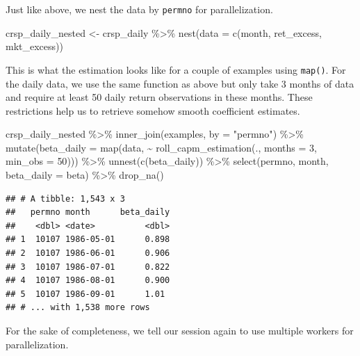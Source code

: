 \documentclass[
]{krantz}
\newenvironment{Shaded}{\begin{snugshade}}{\end{snugshade}}
\newcommand{\AttributeTok}[1]{\textcolor[rgb]{0.61,0.61,0.61}{#1}}
\newcommand{\DecValTok}[1]{\textcolor[rgb]{0.06,0.06,0.06}{#1}}
\newcommand{\FunctionTok}[1]{\textcolor[rgb]{0,0,0}{#1}}
\newcommand{\NormalTok}[1]{#1}
\newcommand{\OtherTok}[1]{\textcolor[rgb]{0.37,0.37,0.37}{#1}}
\newcommand{\SpecialCharTok}[1]{\textcolor[rgb]{0,0,0}{#1}}
\newcommand{\StringTok}[1]{\textcolor[rgb]{0.5,0.5,0.5}{#1}}
\begin{document}
Just like above, we nest the data by \texttt{permno} for parallelization.

\begin{Shaded}
\begin{Highlighting}[]
\NormalTok{crsp\_daily\_nested }\OtherTok{\textless{}{-}}\NormalTok{ crsp\_daily }\SpecialCharTok{\%\textgreater{}\%}
  \FunctionTok{nest}\NormalTok{(}\AttributeTok{data =} \FunctionTok{c}\NormalTok{(month, ret\_excess, mkt\_excess))}
\end{Highlighting}
\end{Shaded}

This is what the estimation looks like for a couple of examples using \texttt{map()}.
For the daily data, we use the same function as above but only take 3 months of data and require at least 50 daily return observations in these months.
These restrictions help us to retrieve somehow smooth coefficient estimates.

\begin{Shaded}
\begin{Highlighting}[]
\NormalTok{crsp\_daily\_nested }\SpecialCharTok{\%\textgreater{}\%}
  \FunctionTok{inner\_join}\NormalTok{(examples, }\AttributeTok{by =} \StringTok{"permno"}\NormalTok{) }\SpecialCharTok{\%\textgreater{}\%}
  \FunctionTok{mutate}\NormalTok{(}\AttributeTok{beta\_daily =} \FunctionTok{map}\NormalTok{(data, }\SpecialCharTok{\textasciitilde{}} \FunctionTok{roll\_capm\_estimation}\NormalTok{(., }\AttributeTok{months =} \DecValTok{3}\NormalTok{, }\AttributeTok{min\_obs =} \DecValTok{50}\NormalTok{))) }\SpecialCharTok{\%\textgreater{}\%}
  \FunctionTok{unnest}\NormalTok{(}\FunctionTok{c}\NormalTok{(beta\_daily)) }\SpecialCharTok{\%\textgreater{}\%}
  \FunctionTok{select}\NormalTok{(permno, month, }\AttributeTok{beta\_daily =}\NormalTok{ beta) }\SpecialCharTok{\%\textgreater{}\%}
  \FunctionTok{drop\_na}\NormalTok{()}
\end{Highlighting}
\end{Shaded}

\begin{verbatim}
## # A tibble: 1,543 x 3
##   permno month      beta_daily
##    <dbl> <date>          <dbl>
## 1  10107 1986-05-01      0.898
## 2  10107 1986-06-01      0.906
## 3  10107 1986-07-01      0.822
## 4  10107 1986-08-01      0.900
## 5  10107 1986-09-01      1.01 
## # ... with 1,538 more rows
\end{verbatim}

For the sake of completeness, we tell our session again to use multiple workers for parallelization.
\end{document}
